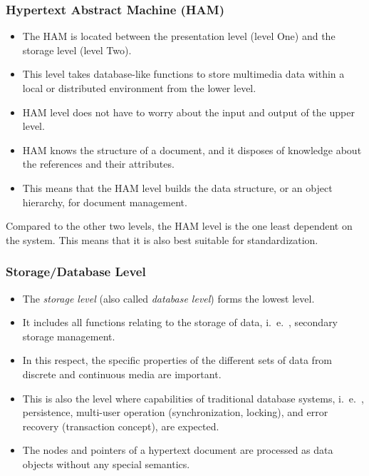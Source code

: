 \subsubsection[Hypertext Abstract Machine]{Hypertext Abstract Machine (HAM)}
\begin{multicols}{2}
	\begin{itemize}
		\item The HAM is located between the presentation level (level One) and the storage level (level Two).
		\item This level takes database-like functions to store multimedia data within a local or distributed environment from the lower level. 
		\item HAM level does not have to worry about the input and output of the upper level. 
		\item HAM knows the structure of a document, and it disposes of knowledge about the references and their attributes. 
		\item This means that the HAM level builds the data structure, or an object hierarchy, for document management. 
	\end{itemize}
\end{multicols}

Compared to the other two levels, the HAM level is the one least dependent on the system. This means that it is also best suitable for standardization.

\subsubsection[Storage Level]{Storage/Database Level}
\begin{multicols}{2}
\begin{itemize}
	\item The \textit{storage level} (also called \textit{database level}) forms the lowest level. 
	\item It includes all functions relating to the storage of data, i.\ e.\ , secondary storage management. 
	\item In this respect, the specific properties of the different sets of data from discrete and continuous media are important. 
	\item This is also the level where capabilities of traditional database systems, i.\ e.\ , persistence, multi-user operation
	(synchronization, locking), and error recovery (transaction concept), are expected. 
	\item The nodes and pointers of a hypertext document are processed as data objects without any special semantics.
\end{itemize}
\end{multicols}



